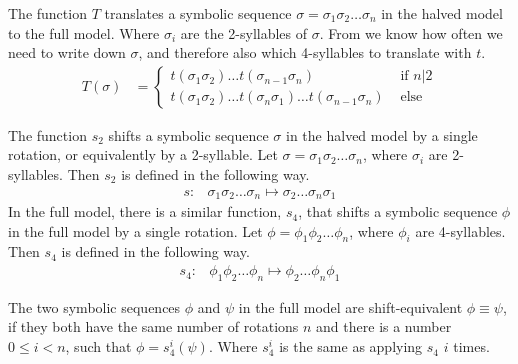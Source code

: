 \begin{definition}
    \label{def:T}
    The function $T$ translates a symbolic sequence $\sigma = \sigma_1\sigma_2 \dots \sigma_n$ in the halved model to the full model.
    Where $\sigma_i$ are the 2-syllables of $\sigma$.
    From  we know how often we need to write down $\sigma$, and therefore also which 4-syllables to translate with $t$.
    \begin{align}
        T(\sigma) & = \begin{cases}
            t(\sigma_1\sigma_2) \dots t(\sigma_{n-1}\sigma_n) & \text{ if } n | 2 \\
            t(\sigma_1\sigma_2) \dots t(\sigma_n\sigma_1) \dots t(\sigma_{n-1}\sigma_n) & \text{ else }
        \end{cases}
    \end{align}
\end{definition}

\begin{definition}
    The function $s_2$ shifts a symbolic sequence $\sigma$ in the halved model by a single rotation, or equivalently by a 2-syllable.
    Let $\sigma = \sigma_1\sigma_2 \dots \sigma_n$, where $\sigma_i$ are 2-syllables.
    Then $s_2$ is defined in the following way.
    \begin{align}
        s: & \sigma_1\sigma_2 \dots \sigma_n \mapsto \sigma_2 \dots \sigma_n\sigma_1
    \end{align}
    In the full model, there is a similar function, $s_4$, that shifts a symbolic sequence $\phi$ in the full model by a single rotation.
    Let $\phi = \phi_1\phi_2 \dots \phi_n$, where $\phi_i$ are 4-syllables.
    Then $s_4$ is defined in the following way.
    \begin{align}
        s_4: & \phi_1\phi_2 \dots \phi_n \mapsto \phi_2 \dots \phi_n\phi_1
    \end{align}
\end{definition}

\begin{definition}
    The two symbolic sequences $\phi$ and $\psi$ in the full model are shift-equivalent $\phi \equiv \psi$,
    if they both have the same number of rotations $n$
    and there is a number $0 \leq i < n$, such that $\phi = s_4^i(\psi)$.
    Where $s_4^i$ is the same as applying $s_4$ $i$ times.
\end{definition}

